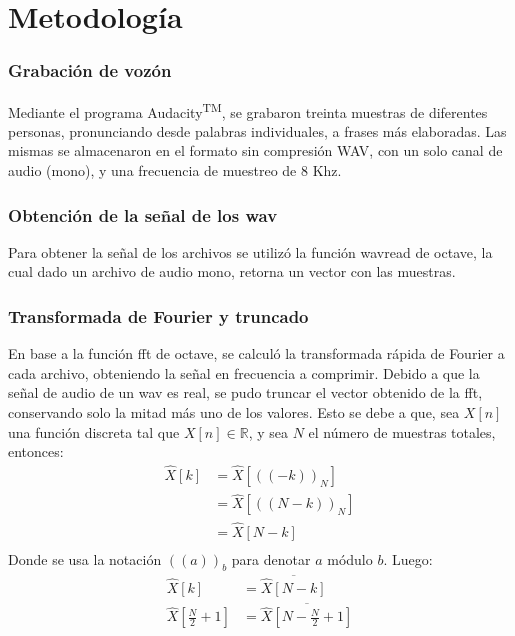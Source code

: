 \documentclass[a4paper,11pt]{article}
\begin{document}
\section{Metodolog\'ia}

\subsubsection{Grabación de voz\'on}
Mediante el programa Audacity\textsuperscript{TM}, se grabaron treinta muestras
de diferentes personas, pronunciando desde palabras individuales, a frases más
elaboradas. Las mismas se almacenaron en el formato sin compresión WAV, con un
solo canal de audio (mono), y una frecuencia de muestreo de $8$ Khz.
\subsubsection{Obtención de la señal de los wav}
Para obtener la señal de los archivos se utilizó la función wavread de octave,
la cual dado un archivo de audio mono, retorna un vector con las muestras.
\subsubsection{Transformada de Fourier y truncado}
En base a la función fft de octave, se calculó la transformada rápida de
Fourier a cada archivo, obteniendo la señal en frecuencia a comprimir.
Debido a que la señal de audio de un wav es real, se pudo truncar el vector
obtenido de la fft, conservando solo la mitad más uno de los valores. Esto se
debe a que, sea $X[n]$ una función discreta tal que $X[n] \in
\mathbb{R}$, y sea $N$ el número de muestras totales, entonces:
\begin{equation} \label{eq1}
    \begin{split}
        \hat{X}[k] & = \hat{X}[((-k))_N] \\
         & = \hat{X}[((N - k))_N] \\
         & = \hat{X}[N-k] \\
     \end{split}
\end{equation}
Donde se usa la notación $((a))_b$ para denotar $a$ módulo $b$.
Luego:
\begin{equation} \label{eq2}
    \begin{split}
        \hat{X}[k] & = \overline{\hat{X}[N-k]} \\
        \hat{X}[\frac{N}{2}+1] & = \overline{\hat{X}[N-\frac{N}{2}+1]} \\
     \end{split}
\end{equation}
\end{document}
